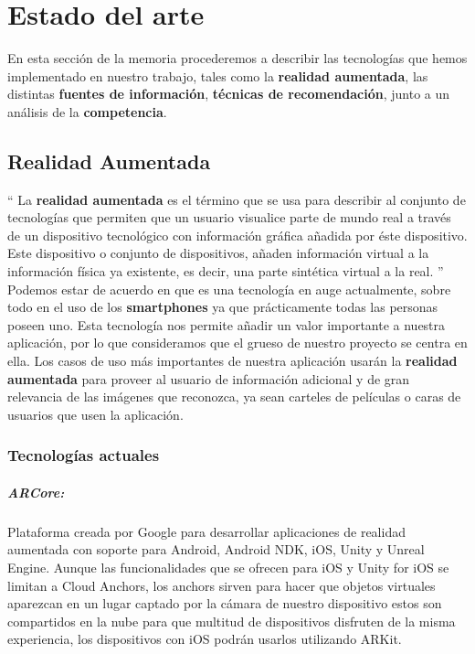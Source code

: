
\cleardoublepage


\chapter{Estado del arte}
\label{makereference2}
En esta sección de la memoria procederemos a describir las tecnologías que hemos implementado
en nuestro trabajo, tales como la \textbf{realidad aumentada}, las distintas \textbf{fuentes de información}, 
\textbf{técnicas de recomendación}, junto a un análisis de la \textbf{competencia}.
\section{Realidad Aumentada}
\label{makereference2.1}
``
La \textbf{realidad aumentada} es el término que se 
usa para describir al conjunto de tecnologías que permiten que un usuario visualice parte de mundo real a través de un dispositivo tecnológico 
con información gráfica añadida por éste dispositivo. Este dispositivo o conjunto de dispositivos, añaden información virtual a la información 
física ya existente, es decir, una parte sintética virtual a la real.
''\cite{rawikipedia}
Podemos estar de acuerdo en que es una tecnología en auge actualmente, sobre todo 
en el uso de los \textbf{smartphones} ya que prácticamente todas las personas poseen uno. Esta tecnología nos permite añadir un valor importante a 
nuestra aplicación, por lo que consideramos que el grueso de nuestro proyecto se centra en ella. Los casos de uso más importantes de nuestra aplicación 
usarán la \textbf{realidad aumentada} para proveer al usuario de información adicional y de gran relevancia de las imágenes que reconozca, ya sean carteles
de películas o caras de usuarios que usen la aplicación.
\subsection{Tecnologías actuales}
\label{makereference2.1.1}
\paragraph{ARCore:}
Plataforma creada por Google para desarrollar aplicaciones de
 realidad aumentada con soporte para Android, Android NDK, iOS,
 Unity y Unreal Engine. Aunque las funcionalidades que se ofrecen
 para iOS y Unity for iOS se limitan a Cloud Anchors, los anchors
 sirven para hacer que objetos virtuales aparezcan en un lugar
 captado por la cámara de nuestro dispositivo estos son compartidos
 en la nube para que multitud de dispositivos disfruten de la misma
 experiencia, los dispositivos con iOS podrán usarlos utilizando ARKit.

